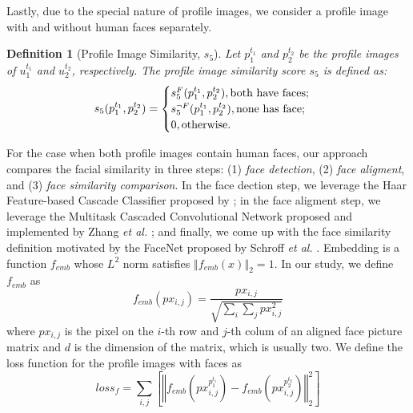 \documentclass[letterpaper,12pt]{article}
\newtheorem{definition}{Definition}
\begin{document}
\noindent Lastly, due to the special nature of profile images, we consider a profile image with and without human faces separately. %
\noindent
\begin{definition}[Profile Image Similarity, $s_5$]
Let $p_{1}^{t_1}$ and $p_{2}^{t_2}$ be the profile images of $u_{1}^{t_1}$ and $u_{2}^{t_2}$, respectively. The profile image similarity score $s_5$ is defined as:
\begin{equation}
s_5(p_{1}^{t_1}, p_{2}^{t_2})=\begin{cases}
s^F_5(p_{1}^{t_1}, p_{2}^{t_2}), \hbox{both have faces};\\
s^{\neg F}_5(p_{1}^{t_1}, p_{2}^{t_2}), \hbox{none has face};\\
0, \hbox{otherwise}.
\end{cases}
\end{equation}
\label{def:image}
\end{definition}

\noindent For the case when both profile images contain human faces, our approach compares the facial similarity in three steps: (1) \textit{face detection}, (2) \textit{face aligment}, and (3) \textit{face similarity comparison}. In the face dection step, we leverage the Haar Feature-based Cascade Classifier proposed by \cite{viola2001rapid}\cite{lienhart2002extended}; in the face aligment step, we leverage the Multitask Cascaded Convolutional Network proposed and implemented by Zhang \emph{et al.} \cite{zhang2016joint}; and finally, we come up with the face similarity definition motivated by the FaceNet proposed by Schroff \emph{et al.} \cite{schroff2015facenet}. Embedding \cite{schroff2015facenet} is a function $f_{emb}$ whose $L^2$ norm satisfies $\left\Vert f_{emb}(x)\right\Vert _{2}=1$. In our study, we define $f_{emb}$ as
\begin{equation}
f_{emb}(px_{i,j})=\frac{px_{i,j}}{\sqrt{\sum_{i} \sum_{j} px_{i,j}^{2}}}
\end{equation}
where $px_{i,j}$ is the pixel on the $i$-th row and $j$-th colum of an aligned face picture matrix and $d$ is the dimension of the matrix, which is usually two. We define the loss function for the profile images with faces as
\begin{equation}
loss_f=\underset{i,j}{\sum}\left[\left\Vert f_{emb}(px_{i,j}^{p_{1}^{t_1}})-f_{emb}(px_{i,j}^{p_{2}^{t_2}})\right\Vert _{2}^{2}\right]
\end{equation}
\end{document}
